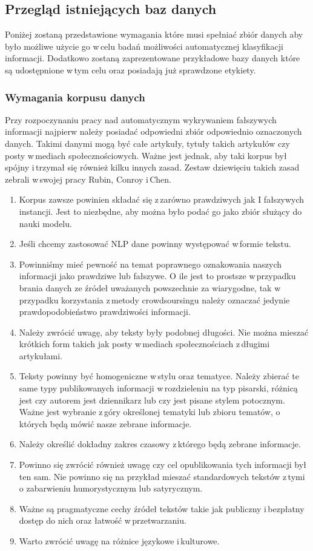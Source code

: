 \subsection{Przegląd istniejących baz danych}
Poniżej zostaną przedstawione wymagania które musi spełniać zbiór danych aby było możliwe użycie go w\,celu badań możliwości automatycznej klasyfikacji informacji. Dodatkowo zostaną zaprezentowane przykładowe bazy danych które są udostępnione w\,tym celu oraz posiadają już sprawdzone etykiety.
\subsubsection{Wymagania korpusu danych}
Przy rozpoczynaniu pracy nad automatycznym wykrywaniem fałszywych informacji najpierw należy posiadać odpowiedni zbiór odpowiednio oznaczonych danych. Takimi danymi mogą być całe artykuły, tytuły takich artykułów czy posty w\,mediach społecznościowych. Ważne jest jednak, aby taki korpus był spójny i\,trzymał się również kilku innych zasad. Zestaw dziewięciu takich zasad zebrali w\,swojej pracy Rubin, Conroy i\,Chen\cite{rubin2015deception}.
\begin{enumerate}
    \item Korpus zawsze powinien składać się z\,zarówno prawdziwych jak I fałszywych instancji. Jest to niezbędne, aby można było podać go jako zbiór służący do nauki modelu.
    \item Jeśli chcemy zastosować NLP dane powinny występować w\,formie tekstu.
    \item Powinniśmy mieć pewność na temat poprawnego oznakowania naszych informacji jako prawdziwe lub fałszywe. O ile jest to prostsze w\,przypadku brania danych ze źródeł uważanych powszechnie za wiarygodne, tak w\,przypadku korzystania z\,metody crowdsoursingu należy oznaczać jedynie prawdopodobieństwo prawdziwości informacji.
    \item Należy zwrócić uwagę, aby teksty były podobnej długości. Nie można mieszać krótkich form takich jak posty w\,mediach społecznościach z\,długimi artykułami.
    \item Teksty powinny być homogeniczne w\,stylu oraz tematyce. Należy zbierać te same typy publikowanych informacji w\,rozdzieleniu na typ pisarski, różnicą jest czy autorem jest dziennikarz lub czy jest pisane stylem potocznym. Ważne jest wybranie z\,góry określonej tematyki lub zbioru tematów, o których będą mówić nasze zebrane informacje.
    \item Należy określić dokładny zakres czasowy z\,którego będą zebrane informacje.
    \item Powinno się zwrócić również uwagę czy cel opublikowania tych informacji był ten sam. Nie powinno się na przykład mieszać standardowych tekstów z\,tymi o zabarwieniu humorystycznym lub satyrycznym.
    \item Ważne są pragmatyczne cechy źródeł tekstów takie jak publiczny i\,bezpłatny dostęp do nich oraz łatwość w\,przetwarzaniu.
    \item Warto zwrócić uwagę na różnice językowe i\,kulturowe.

\end{enumerate}


